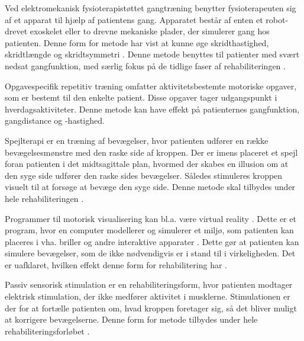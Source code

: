 Ved elektromekanisk fysioterapistøttet gangtræning benytter fysioterapeuten sig af et apparat til hjælp af patientens gang. Apparatet består af enten et robot-drevet exoskelet eller to drevne mekaniske plader, der simulerer gang hos patienten. \cite{Mehrholz2013} Denne form for metode har vist at kunne øge skridthastighed, skridtlængde og skridtsymmetri \cite{Sundhedsstyrelsen2010}. Denne metode benyttes til patienter med svært nedsat gangfunktion, med særlig fokus på de tidlige faser af rehabiliteringen \cite{Sundhedsstyrelsen2011a}.

Opgavespecifik repetitiv træning omfatter aktivitetsbestemte motoriske opgaver, som er bestemt til den enkelte patient. Disse opgaver tager udgangspunkt i hverdagsaktiviteter. Denne metode kan have effekt på patienternes gangfunktion, gangdistance og -hastighed. \cite{Sundhedsstyrelsen2010}

Spejlterapi er en træning af bevægelser, hvor patienten udfører en række bevægelsesmønstre med den raske side af kroppen. Der er imens placeret et spejl foran patienten i det midtsagittale plan, hvormed der skabes en illusion om at den syge side udfører den raske sides bevægelser. Således stimuleres kroppen visuelt til at forsøge at bevæge den syge side.\cite{Thieme2012} Denne metode skal tilbydes under hele rehabiliteringen \cite{Sundhedsstyrelsen2011a}.

Programmer til motorisk visualisering kan bl.a. være virtual reality \cite{Sundhedsstyrelsen2010}. Dette er et program, hvor en computer modellerer og simulerer et miljø, som patienten kan placeres i vha. briller og andre interaktive apparater \cite{Lowood2015}. Dette gør at patienten kan simulere bevægelser, som de ikke nødvendigvis er i stand til i virkeligheden. Det er uafklaret, hvilken effekt denne form for rehabilitering har \cite{Sundhedsstyrelsen2010}.

Passiv sensorisk stimulation er en rehabiliteringsform, hvor patienten modtager elektrisk stimulation, der ikke medfører aktivitet i musklerne. Stimulationen er der for at fortælle patienten om, hvad kroppen foretager sig, så det bliver muligt at korrigere bevægelserne. \cite{Sundhedsstyrelsen2010} Denne form for metode tilbydes under hele rehabiliteringsforløbet \cite{Sundhedsstyrelsen2011a}.
%
%
